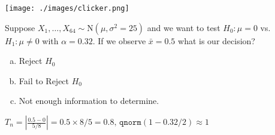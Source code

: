 \begin{frame}{\texttt{[image: ./images/clicker.png]}}

    Suppose $X_1, \dots, X_{64} \sim \mbox{N}(\mu, \sigma^2 = 25)$ and we want to test $H_0\colon \mu = 0$ vs.\ $H_1\colon  \mu \neq 0$ with $\alpha = 0.32$. If we observe $\bar{x} = 0.5$ what is our decision?

  \begin{enumerate}[(a)]
    \item Reject $H_0$
    \item Fail to Reject $H_0$
    \item Not enough information to determine.
    \end{enumerate}

    \pause
    \vspace{1em}

    \alert{$T_n = \left| \frac{0.5 - 0}{5/8}\right| = 0.5 \times 8/5 = 0.8, \,\texttt{qnorm}(1 - 0.32/2) \approx 1$}\\
    \vspace{0.5em}
    \alert{}

\end{frame}
